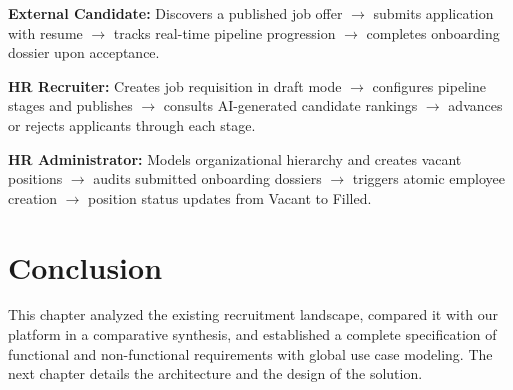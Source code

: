\textbf{External Candidate:} Discovers a published job offer $\rightarrow$ submits application with resume $\rightarrow$ tracks real-time pipeline progression $\rightarrow$ completes onboarding dossier upon acceptance.

\textbf{HR Recruiter:} Creates job requisition in draft mode $\rightarrow$ configures pipeline stages and publishes $\rightarrow$ consults AI-generated candidate rankings $\rightarrow$ advances or rejects applicants through each stage.

\textbf{HR Administrator:} Models organizational hierarchy and creates vacant positions $\rightarrow$ audits submitted onboarding dossiers $\rightarrow$ triggers atomic employee creation $\rightarrow$ position status updates from Vacant to Filled.

\section*{Conclusion}

This chapter analyzed the existing recruitment landscape, compared it with our platform in a comparative synthesis, and established a complete specification of functional and non-functional requirements with global use case modeling. The next chapter details the architecture and the design of the solution.